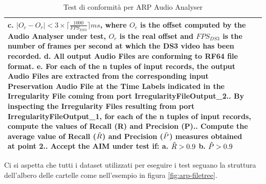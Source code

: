 \begin{spacing}{1.1}
\begin{table}[H]
\begin{tabular}{|p{}|p{}|}
            	   c.	$|O_c - O_r| < 3 \times \lceil\frac{1000}{FPS_{DS3}}\rceil ms$, where $O_c$ is the offset computed by the Audio Analyser under test, $O_r$ is the real offset and $FPS_{DS3}$ is the number of frames per second at which the DS3 video has been recorded.\newline
            	   d.	All output Audio Files are conforming to RF64 file format.\newline
            	   e.	For each of the n tuples of input records, the output Audio Files are extracted from the corresponding input Preservation Audio File at the Time Labels indicated in the Irregularity File coming from port IrregularityFileOutput\_2.\newline
            	2.	By inspecting the Irregularity Files resulting from port IrregularityFileOutput\_1, for each of the n tuples of input records, compute the values of Recall (R) and Precision (P).\newline
            	3.	Compute the average value of Recall ($\Tilde{R}$) and Precision ($\Tilde{P}$) measures obtained at point 2.\newline
            	4.	Accept the AIM under test if:\newline
                	a.	$\Tilde{R} > 0.9$\newline
                	b.	$\Tilde{P} > 0.9$\\
        \hline
    \end{tabular}
    \caption{Test di conformità per \ac{ARP} Audio Analyser}
    \label{tab:audioanalyser-valutazione}
\end{table}

Ci si aspetta che tutti i dataset utilizzati per eseguire i test seguano la struttura dell'albero delle cartelle come nell'esempio in figura \ref{fig:arp-filetree}.


\end{spacing}
